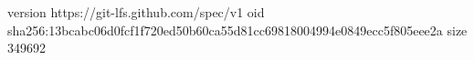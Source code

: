 version https://git-lfs.github.com/spec/v1
oid sha256:13bcabc06d0fcf1f720ed50b60ca55d81cc69818004994e0849ecc5f805eee2a
size 349692
